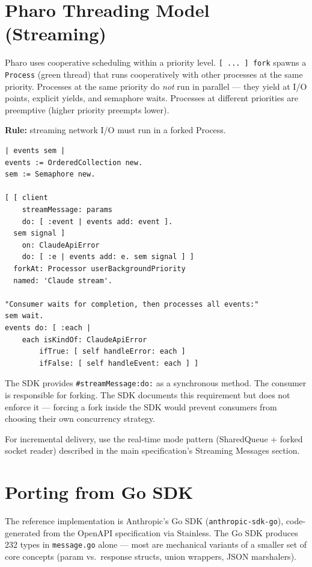 \documentclass[a4paper,10pt,fleqn]{article}
\newcommand{\sel}[1]{\texttt{\##1}}
\begin{document}
\section{Pharo Threading Model (Streaming)}

Pharo uses cooperative scheduling within a priority level.  \texttt{[ ... ]
fork} spawns a \texttt{Process} (green thread) that runs cooperatively with
other processes at the same priority.  Processes at the same priority do
\emph{not} run in parallel --- they yield at I/O points, explicit yields,
and semaphore waits.  Processes at different priorities are preemptive (higher
priority preempts lower).

\textbf{Rule:} streaming network I/O must run in a forked Process.

\begin{lstlisting}[language={},title={Simple streaming pattern (buffered)}]
| events sem |
events := OrderedCollection new.
sem := Semaphore new.

[ [ client
    streamMessage: params
    do: [ :event | events add: event ].
  sem signal ]
    on: ClaudeApiError
    do: [ :e | events add: e. sem signal ] ]
  forkAt: Processor userBackgroundPriority
  named: 'Claude stream'.

"Consumer waits for completion, then processes all events:"
sem wait.
events do: [ :each |
    each isKindOf: ClaudeApiError
        ifTrue: [ self handleError: each ]
        ifFalse: [ self handleEvent: each ] ]
\end{lstlisting}

The SDK provides \sel{streamMessage:do:} as a synchronous method.  The
consumer is responsible for forking.  The SDK documents this requirement
but does not enforce it --- forcing a fork inside the SDK would prevent
consumers from choosing their own concurrency strategy.

For incremental delivery, use the real-time mode pattern (SharedQueue +
forked socket reader) described in the main specification's Streaming
Messages section.

\section{Porting from Go SDK}

The reference implementation is Anthropic's Go SDK
(\texttt{anthropic-sdk-go}), code-generated from the OpenAPI specification
via Stainless.  The Go SDK produces 232 types in \texttt{message.go}
alone --- most are mechanical variants of a smaller set of core concepts
(param vs.\ response structs, union wrappers, JSON marshalers).
\end{document}
